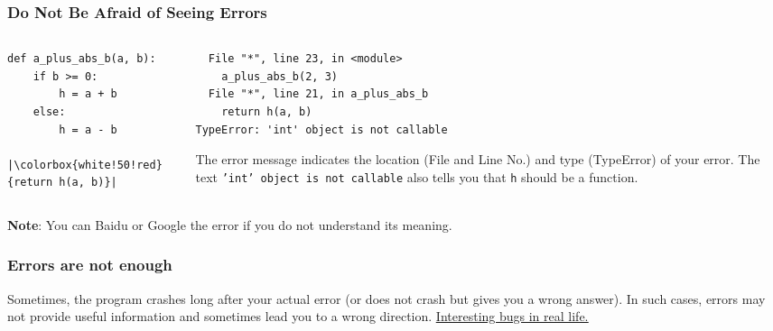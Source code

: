 \documentclass[aspectratio=169]{beamer}
\begin{document}
\begin{frame}[fragile]
\frametitle{Do Not Be Afraid of Seeing Errors}
\begin{columns}
\begin{column}{0.3\textwidth}
\begin{verbatim}
def a_plus_abs_b(a, b): 
    if b >= 0:
        h = a + b
    else:
        h = a - b
    |\colorbox{white!50!red}{return h(a, b)}|
\end{verbatim}
\end{column}
\begin{column}{0.7\textwidth}  
\begin{center}
\begin{verbatim}
  File "*", line 23, in <module>
    a_plus_abs_b(2, 3)
  File "*", line 21, in a_plus_abs_b
    return h(a, b)
TypeError: 'int' object is not callable
\end{verbatim}
\end{center}
The error message indicates the location (File and Line No.) and type (TypeError) of your error. 
The text \texttt{'int' object is not callable} also tells you that \texttt{h} should be a function.
\end{column}
\end{columns}

\vspace{5mm}
\textbf{Note}: You can Baidu or Google the error if you do not understand its meaning.
\end{frame}


\begin{frame}
\frametitle{Errors are not enough}

\vspace{1.5cm}
Sometimes, the program crashes long after your actual error (or does not crash but gives you a wrong answer). In such cases, errors may not provide useful information and sometimes lead you to a wrong direction.
\vfill
\href{https://www.zhihu.com/question/21747929}{\underline{Interesting bugs in real life.}}

\end{frame}
\end{document}
